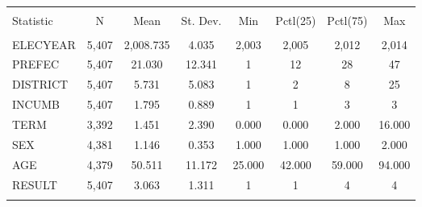 
\begin{table}[!htbp] \centering 
  \caption{} 
  \label{} 
\begin{tabular}{@{\extracolsep{5pt}}lccccccc} 
\\[-1.8ex]\hline 
\hline \\[-1.8ex] 
Statistic & \multicolumn{1}{c}{N} & \multicolumn{1}{c}{Mean} & \multicolumn{1}{c}{St. Dev.} & \multicolumn{1}{c}{Min} & \multicolumn{1}{c}{Pctl(25)} & \multicolumn{1}{c}{Pctl(75)} & \multicolumn{1}{c}{Max} \\ 
\hline \\[-1.8ex] 
ELECYEAR & 5,407 & 2,008.735 & 4.035 & 2,003 & 2,005 & 2,012 & 2,014 \\ 
PREFEC & 5,407 & 21.030 & 12.341 & 1 & 12 & 28 & 47 \\ 
DISTRICT & 5,407 & 5.731 & 5.083 & 1 & 2 & 8 & 25 \\ 
INCUMB & 5,407 & 1.795 & 0.889 & 1 & 1 & 3 & 3 \\ 
TERM & 3,392 & 1.451 & 2.390 & 0.000 & 0.000 & 2.000 & 16.000 \\ 
SEX & 4,381 & 1.146 & 0.353 & 1.000 & 1.000 & 1.000 & 2.000 \\ 
AGE & 4,379 & 50.511 & 11.172 & 25.000 & 42.000 & 59.000 & 94.000 \\ 
RESULT & 5,407 & 3.063 & 1.311 & 1 & 1 & 4 & 4 \\ 
\hline \\[-1.8ex] 
\end{tabular} 
\end{table} 
